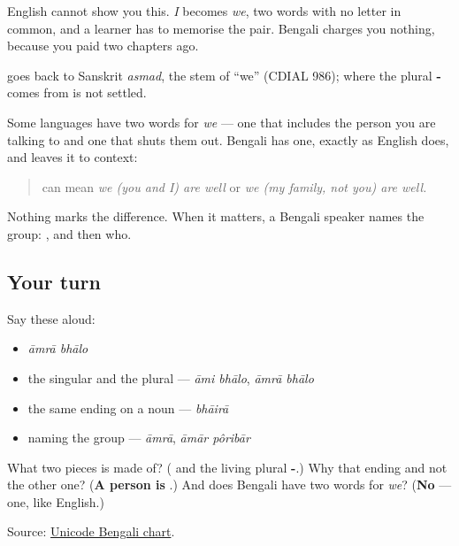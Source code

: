 English cannot show you this. \emph{I} becomes \emph{we}, two words with no letter in common, and a learner has to memorise the pair. Bengali charges you nothing, because you paid two chapters ago.

\begin{cousinweb}
\textbf{} goes back to Sanskrit \emph{asmad}, the stem of \textquotedblleft{}we\textquotedblright{} (CDIAL 986); where the plural \textbf{-} comes from is not settled.
\end{cousinweb}

\begin{grammarlens}[title={Grammar Lens: exclusive or inclusive? Bengali does not say}]
Some languages have two words for \emph{we} — one that includes the person you are talking to and one that shuts them out. Bengali has one, exactly as English does, and leaves it to context:

\begin{quote}
\textbf{ } can mean \emph{we (you and I) are well} or \emph{we (my family, not you) are well.}
\end{quote}

Nothing marks the difference. When it matters, a Bengali speaker names the group: \textbf{}, and then who.
\end{grammarlens}

\subsection*{Your turn}
Say these aloud:

\begin{itemize}
\raggedright
  \item \emph{āmrā bhālo}
  \item the singular and the plural — \emph{āmi bhālo}, \emph{āmrā bhālo}
  \item the same ending on a noun — \emph{bhāirā}
  \item naming the group — \emph{āmrā}, \emph{āmār pôribār}
\end{itemize}

\begin{tcolorbox}[breakable,colback=teal!4,colframe=teal!35!black,title={Before you move on}]
What two pieces is \textbf{} made of? (\textbf{} and the living plural \textbf{-}.) Why that ending and not the other one? (\textbf{A person is }.) And does Bengali have two words for \emph{we}? (\textbf{No} — one, like English.)

Source: \href{https://www.unicode.org/charts/PDF/U0980.pdf}{Unicode Bengali chart}.
\end{tcolorbox}
